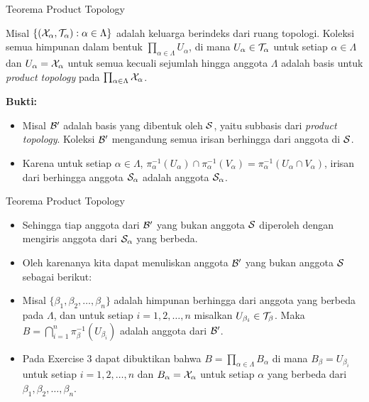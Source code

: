     \begin{frame}{Teorema Product Topology}
        \begin{tcolorbox}[enhanced,title=Teorema 2.28,frame style tile={width=\paperwidth}{wallpaper}]
            Misal $\{(\mathcal{X}_\alpha,\mathcal{T}_\alpha): \alpha\in\Lambda\}$ adalah keluarga berindeks dari ruang topologi. Koleksi semua himpunan dalam bentuk $\prod_{\alpha\in\Lambda}U_\alpha$, di mana $U_\alpha\in\mathcal{T}_\alpha$ untuk setiap $\alpha\in\Lambda$ dan $U_\alpha = \mathcal{X}_\alpha$ untuk semua kecuali sejumlah hingga anggota $\Lambda$ adalah basis untuk \textit{product topology} pada $\prod_{\alpha\in\Lambda}\mathcal{X}_\alpha$.
        \end{tcolorbox}
        \textbf{Bukti:}
        \begin{itemize}
            \item Misal $\mathcal{B}'$ adalah basis yang dibentuk oleh $\mathcal{S}$, yaitu subbasis dari \textit{product topology}. Koleksi $\mathcal{B}'$ mengandung semua irisan berhingga dari anggota di $\mathcal{S}$.
            \item Karena untuk setiap $\alpha\in\Lambda$, $\pi_\alpha^{-1}(U_\alpha)\cap\pi_\alpha^{-1}(V_\alpha) = \pi_{\alpha}^{-1}(U_\alpha\cap V_\alpha)$, irisan dari berhingga anggota $\mathcal{S}_\alpha$ adalah anggota $\mathcal{S}_\alpha$.
            \end{itemize}
    \end{frame}
    
    \begin{frame}{Teorema Product Topology}
        \begin{itemize}
            \item Sehingga tiap anggota dari $\mathcal{B}'$ yang bukan anggota $\mathcal{S}$ diperoleh dengan mengiris anggota dari $\mathcal{S}_\alpha$ yang berbeda.
            \item Oleh karenanya kita dapat menuliskan anggota $\mathcal{B}'$ yang bukan anggota $\mathcal{S}$ sebagai berikut:
            \item Misal $\{\beta_1,\beta_2,\ldots,\beta_n\}$ adalah himpunan berhingga dari anggota yang berbeda pada $\Lambda$, dan untuk setiap $i = 1,2,\ldots,n$ misalkan $U_{\beta_i}\in\mathcal{T}_{\beta}$. Maka $B = \bigcap_{i = 1}^{n}\pi_\beta^{-1}(U_{\beta_i})$ adalah anggota dari $\mathcal{B}'$.
            \item Pada Exercise 3 dapat dibuktikan bahwa $B = \prod_{\alpha\in\Lambda}B_\alpha$ di mana $B_\beta = U_{\beta_i}$ untuk setiap $i = 1,2,\ldots,n$ dan $B_\alpha = \mathcal{X}_\alpha$ untuk setiap $\alpha$ yang berbeda dari $\beta_1,\beta_2,\ldots,\beta_n$.
        \end{itemize}
    \end{frame}
    
